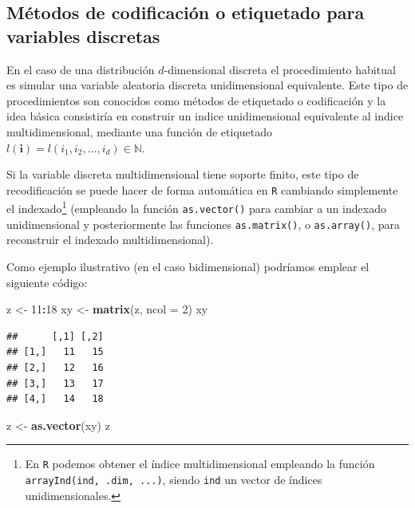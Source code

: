 \documentclass[
]{book}
\newenvironment{Shaded}{\begin{snugshade}}{\end{snugshade}}
\newcommand{\DataTypeTok}[1]{\textcolor[rgb]{0.13,0.29,0.53}{#1}}
\newcommand{\DecValTok}[1]{\textcolor[rgb]{0.00,0.00,0.81}{#1}}
\newcommand{\KeywordTok}[1]{\textcolor[rgb]{0.13,0.29,0.53}{\textbf{#1}}}
\newcommand{\NormalTok}[1]{#1}
\newcommand{\OperatorTok}[1]{\textcolor[rgb]{0.81,0.36,0.00}{\textbf{#1}}}
\newcommand{\StringTok}[1]{\textcolor[rgb]{0.31,0.60,0.02}{#1}}
\theoremstyle{break}
\theoremstyle{definition}
\theoremstyle{definition}
\theoremstyle{definition}
\theoremstyle{remark}
\begin{document}
\hypertarget{muxe9todos-de-codificaciuxf3n-o-etiquetado-para-variables-discretas}{%
\subsection{Métodos de codificación o etiquetado para variables discretas}\label{muxe9todos-de-codificaciuxf3n-o-etiquetado-para-variables-discretas}}

En el caso de una distribución \(d\)-dimensional discreta el procedimiento habitual es simular una variable aleatoria discreta unidimensional equivalente.
Este tipo de procedimientos son conocidos como métodos de etiquetado o codificación y la idea básica consistiría en construir un
indice unidimensional equivalente al indice multidimensional,
mediante una función de etiquetado
\(l(\mathbf{i}) = l\left(i_1, i_2, \ldots,i_d \right) \in \mathbb{N}\).

Si la variable discreta multidimensional tiene soporte finito, este tipo de recodificación se puede hacer de forma automática en \texttt{R} cambiando simplemente el indexado\footnote{En \texttt{R} podemos obtener el índice multidimensional empleando la función \texttt{arrayInd(ind,\ .dim,\ ...)}, siendo \texttt{ind} un vector de índices unidimensionales.} (empleando la función \texttt{as.vector()} para cambiar a un indexado unidimensional y posteriormente las funciones \texttt{as.matrix()}, o \texttt{as.array()}, para reconstruir el indexado multidimensional).

Como ejemplo ilustrativo (en el caso bidimensional) podríamos emplear el siguiente código:

\begin{Shaded}
\begin{Highlighting}[]
\NormalTok{z <-}\StringTok{ }\DecValTok{11}\OperatorTok{:}\DecValTok{18}
\NormalTok{xy <-}\StringTok{ }\KeywordTok{matrix}\NormalTok{(z, }\DataTypeTok{ncol =} \DecValTok{2}\NormalTok{)}
\NormalTok{xy}
\end{Highlighting}
\end{Shaded}

\begin{verbatim}
##      [,1] [,2]
## [1,]   11   15
## [2,]   12   16
## [3,]   13   17
## [4,]   14   18
\end{verbatim}

\begin{Shaded}
\begin{Highlighting}[]
\NormalTok{z <-}\StringTok{ }\KeywordTok{as.vector}\NormalTok{(xy)}
\NormalTok{z}
\end{Highlighting}
\end{Shaded}
\end{document}
